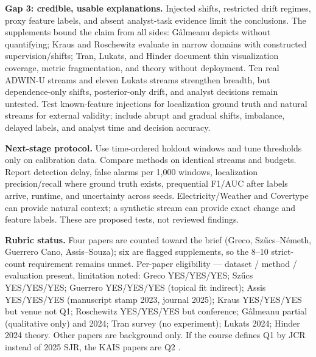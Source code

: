 \documentclass[10pt,a4paper]{article}
\begin{document}
\textbf{Gap 3: credible, usable explanations.} Injected shifts, restricted drift regimes, proxy feature labels, and absent analyst-task evidence limit the conclusions. The supplements bound the claim from all sides: G\^almeanu depicts without quantifying; Kraus and Roschewitz evaluate in narrow domains with constructed supervision/shifts; Tran, Lukats, and Hinder document thin visualization coverage, metric fragmentation, and theory without deployment. Ten real ADWIN-U streams and eleven Lukats streams strengthen breadth, but dependence-only shifts, posterior-only drift, and analyst decisions remain untested. Test known-feature injections for localization ground truth and natural streams for external validity; include abrupt and gradual shifts, imbalance, delayed labels, and analyst time and decision accuracy.

\textbf{Next-stage protocol.} Use time-ordered holdout windows and tune thresholds only on calibration data. Compare methods on identical streams and budgets. Report detection delay, false alarms per 1,000 windows, localization precision/recall where ground truth exists, prequential F1/AUC after labels arrive, runtime, and uncertainty across seeds. Electricity/Weather and Covertype can provide natural context; a synthetic stream can provide exact change and feature labels. These are proposed tests, not reviewed findings.

\textbf{Rubric status.} Four papers are counted toward the brief (Greco, Sz\H{u}cs--N\'emeth, Guerrero Cano, Assis--Souza); six are flagged supplements, so the 8--10 strict-count requirement remains unmet. Per-paper eligibility --- dataset / method / evaluation present, limitation noted: Greco YES/YES/YES; Sz\H{u}cs YES/YES/YES; Guerrero YES/YES/YES (topical fit indirect); Assis YES/YES/YES (manuscript stamp 2023, journal 2025); Kraus YES/YES/YES but venue not Q1; Roschewitz YES/YES/YES but conference; G\^almeanu partial (qualitative only) and 2024; Tran survey (no experiment); Lukats 2024; Hinder 2024 theory. Other papers are background only. If the course defines Q1 by JCR instead of 2025 SJR, the KAIS papers are Q2 \cite{ranking}.
\end{document}
